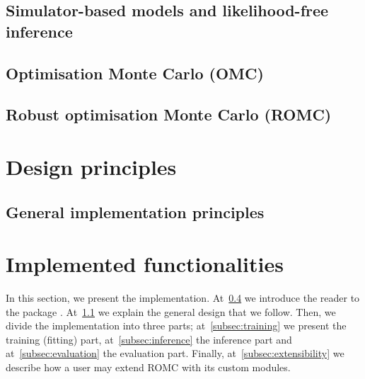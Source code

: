 \documentclass[article]{jss}
\begin{document}
%

\subsection{Simulator-based models and likelihood-free inference}


\subsection{Optimisation Monte Carlo (OMC)}


\subsection{Robust optimisation Monte Carlo (ROMC)}


\subsection[Engine for likelihood-free inference (ELFI)]{}
\label{subsec:ELFI}


\section{Design principles}  %



\subsection{General implementation principles}
\label{subsec:general_design}


\section{Implemented functionalities}

In this section, we present the implementation. At~\ref{subsec:ELFI}
we introduce the reader to the  package . At~\ref{subsec:general_design} we explain the general
design that we follow. Then, we divide the implementation into three
parts; at~\ref{subsec:training} we present the training (fitting)
part, at~\ref{subsec:inference} the inference part and
at~\ref{subsec:evaluation} the evaluation part. Finally,
at~\ref{subsec:extensibility} we describe how a user may extend ROMC
with its custom modules.
\end{document}
